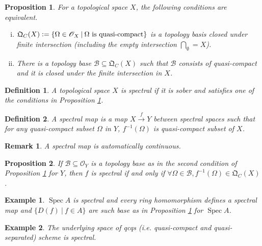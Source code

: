 \documentclass[8pt]{article}
\numberwithin{equation}{section}
\newtheorem{proposition}{Proposition}[subsection]
\newtheorem{definition}{Definition}[subsection]
\newtheorem{remark}{Remark}[subsection]
\newtheorem{example}{Example}[subsection]
\DeclareMathOperator{\straw}{s.t.}
\DeclareMathOperator{\Spec}{Spec}
\newcommand{\defeq}{\vcentcolon=}
\newcommand{\Ouv}{\mathscr{O}}
\newcommand{\sep}[0]{\:|\:}
\newcommand{\QC}[0]{\mathfrak{Q}_C}
\newcommand{\st}[0]{\:\straw\:}
\begin{document}
\begin{proposition}
    \label{proposition_2_5}
    \label{fact_5}
    For a topological space $X$, the following conditions are equivalent.
    \begin{enumerate}[i.]
        \item $\QC(X) \defeq \{\Omega\in\Ouv_X\sep \Omega\text{ is quasi-compact}\}$ is a topology basis closed under finite intersection (including the empty intersection $\bigcap_\emptyset = X$).
        \item There is a topology base $\mathcal{B}\subseteq\QC(X)$ such that $\mathcal{B}$ consists of quasi-compact and it is closed under the finite intersection in $X$.
    \end{enumerate}
\end{proposition}
\begin{definition}
    A topological space $X$ is spectral if it is sober and satisfies one of the conditions in Proposition \ref{proposition_2_5}. 
\end{definition}
\begin{definition}
    A spectral map is a map $X\stackrel{f}{\to}Y$ between spectral spaces such that for any quasi-compact subset $\Omega$ in $Y$, $f^{-1}(\Omega)$ is quasi-compact subset of $X$.
\end{definition}
\begin{remark}
    A spectral map is automatically continuous.
\end{remark}
\begin{proposition}
    \label{facr1.2.6}
    If $\mathcal{B}\subseteq \Ouv_Y$ is a topology base as in the second condition of Proposition \ref{proposition_2_5} for $Y$, then $f$ is spectral if and only if $\forall \Omega\in\mathcal{B},f^{-1}(\Omega)\in\QC(X)$.
\end{proposition}
\begin{example}
    $\Spec A$ is spectral and every ring homomorphism defines a spectral map and $\{D(f)\sep f\in A\}$ are such base as in Proposition \ref{proposition_2_5} for $\Spec A$.
\end{example}
\begin{example}
    The underlying space of qcqs (i.e. quasi-compact and quasi-separated) scheme is spectral.
\end{example}
\end{document}
